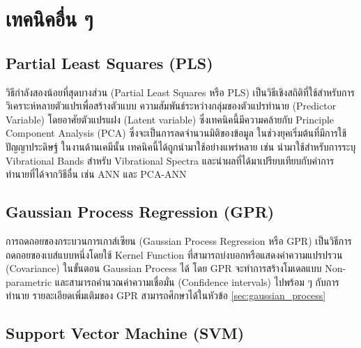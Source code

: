 \section{เทคนิคอื่น ๆ}
\label{sec:other_ml}

\subsection{Partial Least Squares (PLS)}
\label{ssec:pls}

วิธีกำลังสองน้อยที่สุดบางส่วน (Partial Least Squares หรือ PLS) เป็นวิธีเชิงสถิติที่ใช้สำหรับการวิเคราะห์หลายตัวแปรเพื่อสร้างตัวแบบ%
ความสัมพันธ์ระหว่างกลุ่มของตัวแปรทำนาย (Predictor Variable) โดยอาศัยตัวแปรแฝง (Latent variable) ซึ่งเทคนิคนี้มีความคล้ายกับ 
Principle Component Analysis (PCA) ซึ่งจะเป็นการลดจำนวนมิติของข้อมูล\autocite{wold1984} ในช่วงยุคเริ่มต้นที่มีการใช้ปัญญาประดิษฐ์%
ในงานด้านเคมีนั้น เทคนิคนี้ได้ถูกนำมาใช้อย่างแพร่หลาย เช่น นำมาใช้สำหรับการระบุ Vibrational Bands สำหรับ Vibrational Spectra 
และนำผลที่ได้มาเปรียบเทียบกับค่าการทำนายที่ได้จากวิธีอื่น เช่น ANN และ PCA-ANN

\subsection{Gaussian Process Regression (GPR)}
\label{ssec:gpr}

การถดถอยของกระบวนการเกาส์เซียน (Gaussian Process Regression หรือ GPR) เป็นวิธีการถดถอยของเบส์แบบหนึ่งโดยใช้ Kernel Function 
ที่สามารถบ่งบอกหรือแสดงค่าความแปรปรวน (Covariance) ในขั้นตอน Gaussian Process ได้\autocite{rasmussen2005} โดย GPR 
จะทำการสร้างโมเดลแบบ Non-parametric และสามารถคำนวณค่าความเชื่อมั่น (Confidence intervals) ไปพร้อม ๆ กับการทำนาย 
รายละเอียดเพิ่มเติมของ GPR สามารถศึกษาได้ในหัวข้อ \ref{sec:gaussian_process}

\subsection{Support Vector Machine (SVM)}
\label{ssec:svm}

